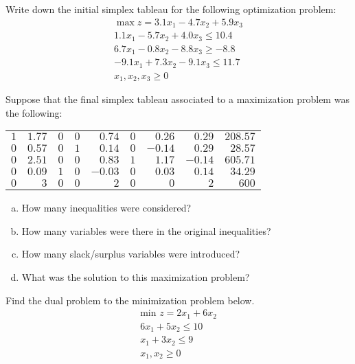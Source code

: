 \documentclass[11pt,letterpaper]{article}
\begin{document}

 Write down the initial simplex tableau for the following optimization problem:
	\[
	\begin{gathered}
	\max z= 3.1x_1 - 4.7x_2 + 5.9x_3 \\
	1.1x_1 - 5.7x_2 + 4.0x_3 \leq 10.4 \\
	6.7x_1 - 0.8x_2 - 8.8x_3 \geq -8.8 \\
	-9.1x_1 + 7.3x_2 - 9.1x_3 \leq 11.7 \\
	x_1, x_2, x_3 \geq 0
	\end{gathered}
	\] 



\newpage



 Suppose that the final simplex tableau associated to a maximization problem was the following: \par
	\begin{table}[!ht]
	\centering
	\begin{tabular}{rrrrrrrrr}
	$1$ & $1.77$ & $0$ & $0$ & $0.74$ & $0$ & $0.26$ & $0.29$ & $208.57$ \\
	$0$ & $0.57$ & $0$ & $1$ & $0.14$ & $0$ & $-0.14$ & $0.29$ & $28.57$ \\
	$0$ & $2.51$ & $0$ & $0$ & $0.83$ & $1$ & $1.17$ & $-0.14$ & $605.71$ \\
	$0$ & $0.09$ & $1$ & $0$ & $-0.03$ & $0$ & $0.03$ & $0.14$ & $34.29$ \\
	$0$ & $3$ & $0$& $0$& $2$ & $0$ & $0$ & $2$ & $600$
	\end{tabular}
	\end{table} \par

\begin{enumerate}[(a)]
\item How many inequalities were considered?
\item How many variables were there in the original inequalities?
\item How many slack/surplus variables were introduced?
\item What was the solution to this maximization problem?
\end{enumerate} 




\newpage



 Find the dual problem to the minimization problem below. 
	\[
	\begin{gathered}
	\text{min } z= 2x_1 + 6x_2 \\
	6x_1 + 5x_2 \leq 10 \\
	x_1 + 3x_2 \leq 9 \\ 
	x_1, x_2 \geq 0
	\end{gathered}
	\]
\end{document}
